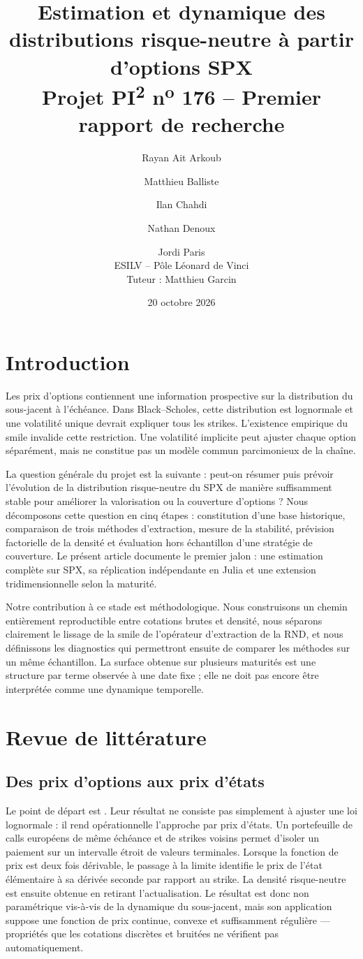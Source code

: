 \documentclass[11pt,a4paper]{article}
\title{\textbf{Estimation et dynamique des distributions risque-neutre à partir d'options SPX}\\[0.4em]
\large Projet PI\textsuperscript{2} n\textsuperscript{o} 176 -- Premier rapport de recherche}
\author{Rayan Ait Arkoub \and Matthieu Balliste \and Ilan Chahdi \and Nathan Denoux \and Jordi Paris\\
\small ESILV -- Pôle Léonard de Vinci\\
\small Tuteur : Matthieu Garcin}
\date{20 octobre 2026}
\numberwithin{equation}{section}
\begin{document}
\maketitle

\section{Introduction}
Les prix d'options contiennent une information prospective sur la distribution du
sous-jacent à l'échéance. Dans Black--Scholes, cette distribution est lognormale et
une volatilité unique devrait expliquer tous les strikes. L'existence empirique du
smile invalide cette restriction. Une volatilité implicite peut ajuster chaque option
séparément, mais ne constitue pas un modèle commun parcimonieux de la chaîne.

La question générale du projet est la suivante : peut-on résumer puis prévoir l'évolution
de la distribution risque-neutre du SPX de manière suffisamment stable pour améliorer
la valorisation ou la couverture d'options ? Nous décomposons cette question en cinq
étapes : constitution d'une base historique, comparaison de trois méthodes d'extraction,
mesure de la stabilité, prévision factorielle de la densité et évaluation hors échantillon
d'une stratégie de couverture. Le présent article documente le premier jalon : une
estimation complète sur SPX, sa réplication indépendante en Julia et une extension
tridimensionnelle selon la maturité.

Notre contribution à ce stade est méthodologique. Nous construisons un chemin entièrement
reproductible entre cotations brutes et densité, nous séparons clairement le lissage de
la smile de l'opérateur d'extraction de la RND, et nous définissons les diagnostics qui
permettront ensuite de comparer les méthodes sur un même échantillon. La surface obtenue
sur plusieurs maturités est une structure par terme observée à une date fixe ; elle ne
doit pas encore être interprétée comme une dynamique temporelle.

\section{Revue de littérature}
\subsection{Des prix d'options aux prix d'états}
Le point de départ est \citet{breeden_litzenberger_1978}. Leur résultat ne consiste
pas simplement à ajuster une loi lognormale : il rend opérationnelle l'approche par
prix d'états. Un portefeuille de calls européens de même échéance et de strikes voisins
permet d'isoler un paiement sur un intervalle étroit de valeurs terminales. Lorsque la
fonction de prix est deux fois dérivable, le passage à la limite identifie le prix de
l'état élémentaire à sa dérivée seconde par rapport au strike. La densité risque-neutre
est ensuite obtenue en retirant l'actualisation. Le résultat est donc non paramétrique
vis-à-vis de la dynamique du sous-jacent, mais son application suppose une fonction de
prix continue, convexe et suffisamment régulière --- propriétés que les cotations
discrètes et bruitées ne vérifient pas automatiquement.
\end{document}
